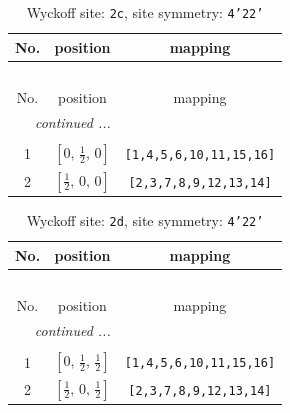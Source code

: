 \documentclass[fleqn,8pt]{jsarticle}
\begin{document}
\renewcommand{\arraystretch}{1.2}
\begin{longtable}{ccc}
\caption{Wyckoff site: {\tt 2c}, site symmetry: {\tt 4'22'}}
 \\
 \hline \hline
No. & position & mapping \\ \hline \endfirsthead

\multicolumn{2}{l}{\tablename\ \thetable{}} \\
 \hline \hline
No. & position & mapping \\ \hline \endhead

 \hline \hline
\multicolumn{2}{r}{\footnotesize\it continued ...} \\ \endfoot

 \hline \hline
\multicolumn{2}{r}{} \\ \endlastfoot

1 & $\left[ 0,\, \frac{1}{2},\, 0 \right]$ & {\tt [1,4,5,6,10,11,15,16]} \\ \hline
2 & $\left[ \frac{1}{2},\, 0,\, 0 \right]$ & {\tt [2,3,7,8,9,12,13,14]} \\
\end{longtable}
\renewcommand{\arraystretch}{1.2}
\begin{longtable}{ccc}
\caption{Wyckoff site: {\tt 2d}, site symmetry: {\tt 4'22'}}
 \\
 \hline \hline
No. & position & mapping \\ \hline \endfirsthead

\multicolumn{2}{l}{\tablename\ \thetable{}} \\
 \hline \hline
No. & position & mapping \\ \hline \endhead

 \hline \hline
\multicolumn{2}{r}{\footnotesize\it continued ...} \\ \endfoot

 \hline \hline
\multicolumn{2}{r}{} \\ \endlastfoot

1 & $\left[ 0,\, \frac{1}{2},\, \frac{1}{2} \right]$ & {\tt [1,4,5,6,10,11,15,16]} \\ \hline
2 & $\left[ \frac{1}{2},\, 0,\, \frac{1}{2} \right]$ & {\tt [2,3,7,8,9,12,13,14]} \\
\end{longtable}
\renewcommand{\arraystretch}{1.2}
\end{document}
